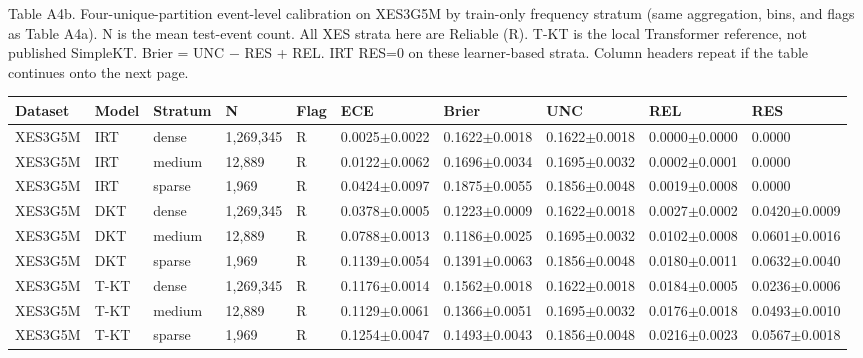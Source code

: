 \documentclass[10pt,a4paper]{article}
\begin{document}
\noindent\begin{minipage}{\textwidth}
\centering
{\fontsize{8}{9.5}\selectfont Table A4b. Four-unique-partition event-level calibration on XES3G5M by train-only frequency stratum (same aggregation, bins, and flags as Table A4a). N is the mean test-event count. All XES strata here are Reliable (R). T-KT is the local Transformer reference, not published SimpleKT. Brier = UNC $-$ RES + REL. IRT RES=0 on these learner-based strata. Column headers repeat if the table continues onto the next page.\par}
\vspace{0.35em}
\begin{adjustbox}{max width=\textwidth}
{\small
\begin{tabular}{@{}llllllllll@{}}
\toprule
Dataset & Model & Stratum & N & Flag & ECE & Brier & UNC & REL & RES \\
\midrule
XES3G5M & IRT & dense & 1,269,345 & R & 0.0025$\pm$0.0022 & 0.1622$\pm$0.0018 & 0.1622$\pm$0.0018 & 0.0000$\pm$0.0000 & 0.0000 \\
XES3G5M & IRT & medium & 12,889 & R & 0.0122$\pm$0.0062 & 0.1696$\pm$0.0034 & 0.1695$\pm$0.0032 & 0.0002$\pm$0.0001 & 0.0000 \\
XES3G5M & IRT & sparse & 1,969 & R & 0.0424$\pm$0.0097 & 0.1875$\pm$0.0055 & 0.1856$\pm$0.0048 & 0.0019$\pm$0.0008 & 0.0000 \\
XES3G5M & DKT & dense & 1,269,345 & R & 0.0378$\pm$0.0005 & 0.1223$\pm$0.0009 & 0.1622$\pm$0.0018 & 0.0027$\pm$0.0002 & 0.0420$\pm$0.0009 \\
XES3G5M & DKT & medium & 12,889 & R & 0.0788$\pm$0.0013 & 0.1186$\pm$0.0025 & 0.1695$\pm$0.0032 & 0.0102$\pm$0.0008 & 0.0601$\pm$0.0016 \\
XES3G5M & DKT & sparse & 1,969 & R & 0.1139$\pm$0.0054 & 0.1391$\pm$0.0063 & 0.1856$\pm$0.0048 & 0.0180$\pm$0.0011 & 0.0632$\pm$0.0040 \\
XES3G5M & T-KT & dense & 1,269,345 & R & 0.1176$\pm$0.0014 & 0.1562$\pm$0.0018 & 0.1622$\pm$0.0018 & 0.0184$\pm$0.0005 & 0.0236$\pm$0.0006 \\
XES3G5M & T-KT & medium & 12,889 & R & 0.1129$\pm$0.0061 & 0.1366$\pm$0.0051 & 0.1695$\pm$0.0032 & 0.0176$\pm$0.0018 & 0.0493$\pm$0.0010 \\
XES3G5M & T-KT & sparse & 1,969 & R & 0.1254$\pm$0.0047 & 0.1493$\pm$0.0043 & 0.1856$\pm$0.0048 & 0.0216$\pm$0.0023 & 0.0567$\pm$0.0018 \\
\bottomrule
\end{tabular}}
\end{adjustbox}
\end{minipage}
\end{document}
